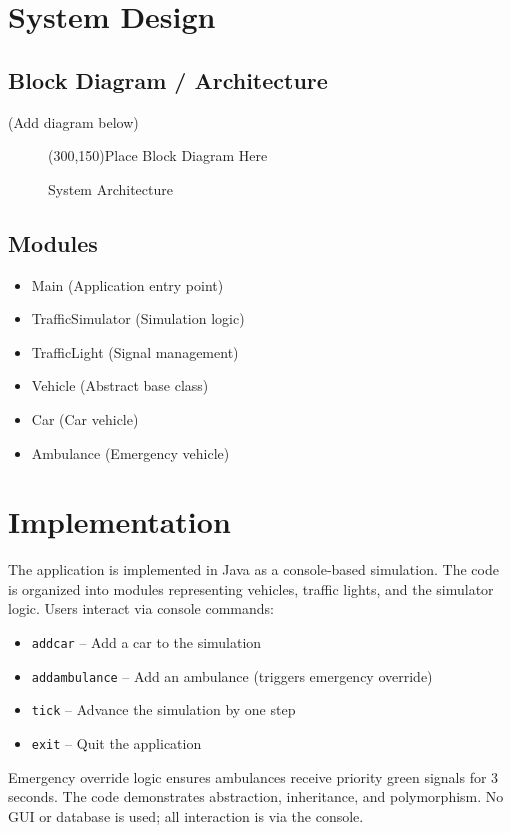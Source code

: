 \documentclass[12pt,a4paper]{article}
\begin{document}
\section{System Design}
\subsection{Block Diagram / Architecture}
(Add diagram below)
\begin{figure}[h]
    \centering
    \framebox(300,150){Place Block Diagram Here} %
    \caption{System Architecture}
\end{figure}

\subsection{Modules}
\begin{itemize}
    \item Main (Application entry point)
    \item TrafficSimulator (Simulation logic)
    \item TrafficLight (Signal management)
    \item Vehicle (Abstract base class)
    \item Car (Car vehicle)
    \item Ambulance (Emergency vehicle)
\end{itemize}

\section{Implementation}
The application is implemented in Java as a console-based simulation. The code is organized into modules representing vehicles, traffic lights, and the simulator logic. Users interact via console commands:
\begin{itemize}
    \item \texttt{addcar} – Add a car to the simulation
    \item \texttt{addambulance} – Add an ambulance (triggers emergency override)
    \item \texttt{tick} – Advance the simulation by one step
    \item \texttt{exit} – Quit the application
\end{itemize}
Emergency override logic ensures ambulances receive priority green signals for 3 seconds. The code demonstrates abstraction, inheritance, and polymorphism. No GUI or database is used; all interaction is via the console.
\end{document}
